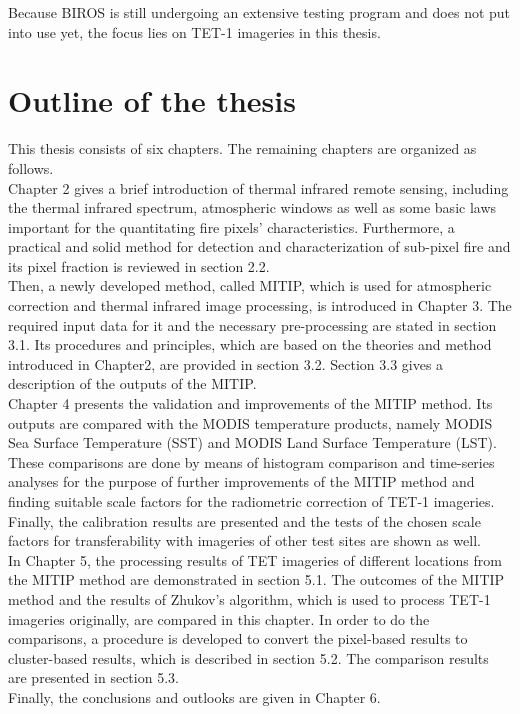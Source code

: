 \noindent Because BIROS is still undergoing an extensive testing program and does not put into use yet, the focus lies on TET-1 imageries in this thesis.\\ 


\section{Outline of the thesis}
This thesis consists of six chapters. The remaining chapters are organized as follows.\\

\noindent Chapter 2 gives a brief introduction of thermal infrared remote sensing, including the thermal infrared spectrum, atmospheric windows as well as some basic laws important for the quantitating fire pixels' characteristics. Furthermore, a practical and solid method for detection and characterization of sub-pixel fire and its pixel fraction is reviewed in section 2.2.\\

\noindent Then, a newly developed method, called MITIP, which is used for atmospheric correction and thermal infrared image processing, is introduced in Chapter 3. The required input data for it and the necessary pre-processing are stated in section 3.1. Its procedures and principles, which are based on the theories and method introduced in Chapter2, are provided in section 3.2. Section 3.3 gives a description of the outputs of the MITIP.\\

\noindent Chapter 4 presents the validation and improvements of the MITIP method. Its outputs are compared with the MODIS temperature products, namely MODIS Sea Surface Temperature (SST) and MODIS Land Surface Temperature (LST). These comparisons are done by means of histogram comparison and time-series analyses for the purpose of further improvements of the MITIP method and finding suitable scale factors for the radiometric correction of TET-1 imageries. Finally, the calibration results are presented and the tests of the chosen scale factors for transferability with imageries of other test sites are shown as well.\\

\noindent In Chapter 5, the processing results of TET imageries of different locations from the MITIP method are demonstrated in section 5.1. The outcomes of the MITIP method and the results of Zhukov's algorithm, which is used to process TET-1 imageries originally, are compared in this chapter. In order to do the comparisons, a procedure is developed to convert the pixel-based results to cluster-based results, which is described in section 5.2. The comparison results are presented in section 5.3.\\

\noindent Finally, the conclusions and outlooks are given in Chapter 6.\\
